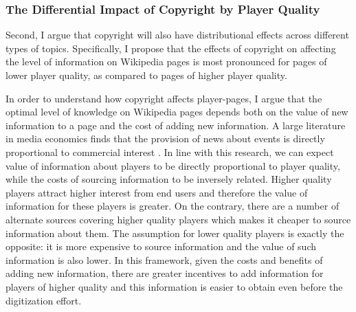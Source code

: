 \documentclass[11pt]{article}
\begin{document}



\subsubsection{The Differential Impact of Copyright by Player Quality}


Second, I argue that copyright will also have distributional effects across different types of topics. Specifically, I propose that the effects of copyright on affecting the level of information on Wikipedia pages is most pronounced for pages of lower player quality, as compared to pages of higher player quality.

In order to understand how copyright affects player-pages, I argue that the optimal level of knowledge on Wikipedia pages depends both on the value of new information to a page and the cost of adding new information. A large literature in media economics finds that the provision of news about events is directly proportional to commercial interest \citep{prat_political_2011, stromberg_natural_2007}. In line with this research, we can expect value of information about players to be directly proportional to player quality, while the costs of sourcing information to be inversely related. Higher quality players attract higher interest from end users and therefore the value of information for these players is greater. On the contrary, there are a number of alternate sources covering higher quality players which makes it cheaper to source information about them. The assumption for lower quality players is exactly the opposite: it is more expensive to source information and the value of such information is also lower. In this framework, given the costs and benefits of adding new information, there are greater incentives to add information for players of higher quality and this information is easier to obtain even before the digitization effort. 
\end{document}
